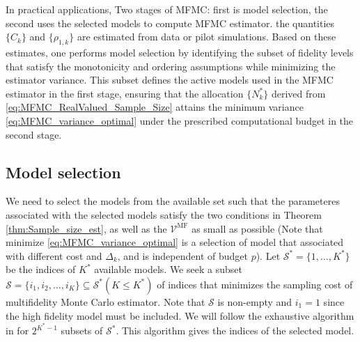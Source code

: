 In practical applications, Two stages of MFMC: first is model selection, the second uses the selected models to compute MFMC estimator. the quantities $\{C_k\}$ and $\{\rho_{1,k}\}$ are estimated from data or pilot simulations. Based on these estimates, one performs model selection by identifying the subset of fidelity levels that satisfy the monotonicity and ordering assumptions while minimizing the estimator variance. This subset defines the active models used in the MFMC estimator in the first stage, ensuring that the allocation $\{N_k^*\}$ derived from \eqref{eq:MFMC_RealValued_Sample_Size} attains the minimum variance \eqref{eq:MFMC_variance_optimal} under the prescribed computational budget in the second stage.

\subsection{Model selection}
We need to select the models from the available set such that the parameteres associated with the selected models satisfy the two conditions in Theorem \ref{thm:Sample_size_est}, as well as the $\mathcal{V}^{\text{MF}}$ as small as possible (Note that minimize \eqref{eq:MFMC_variance_optimal} is a selection of model that associated with different cost and $\Delta_k$, and is independent of budget $p$). Let $\mathcal{S}^*=\{1, \ldots, K^*\}$ be the indices of $K^*$ available models. We seek a subset $\mathcal{S}=\{i_1,i_2, \ldots,i_{K}\}\subseteq \mathcal{S}^* (K\le K^*)$ of indices that minimizes the sampling cost of multifidelity Monte Carlo estimator. Note that $\mathcal{S}$ is non-empty and $i_1=1$ since the high fidelity model must be included. We will follow the exhaustive algorithm in \cite[Algorithm~1]{PeWiGu:2016} for $2^{K^*-1}$ subsets of $\mathcal{S}^*$.  This algorithm gives the indices of the selected model.

